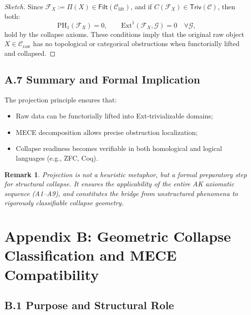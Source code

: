 \documentclass[11pt]{article}
\newtheorem{remark}[theorem]{Remark}
\begin{document}
\begin{proof}[Sketch]
Since \( \mathcal{F}_X := \Pi(X) \in \mathsf{Filt}(\mathcal{C}_{\mathrm{lift}}) \),  
and if \( C(\mathcal{F}_X) \in \mathsf{Triv}(\mathcal{C}) \), then both:
\[
\mathrm{PH}_1(\mathcal{F}_X) = 0, \qquad \mathrm{Ext}^1(\mathcal{F}_X, \mathcal{G}) = 0 \quad \forall \mathcal{G},
\]
hold by the collapse axioms. These conditions imply that the original raw object \( X \in \mathcal{C}_{\mathrm{raw}} \)  
has no topological or categorical obstructions when functorially lifted and collapsed.
\end{proof}

\subsection*{A.7 Summary and Formal Implication}

The projection principle ensures that:

\begin{itemize}
  \item Raw data can be functorially lifted into Ext-trivializable domains;
  \item MECE decomposition allows precise obstruction localization;
  \item Collapse readiness becomes verifiable in both homological and logical languages (e.g., ZFC, Coq).
\end{itemize}

\begin{remark}
Projection is not a heuristic metaphor, but a formal preparatory step for structural collapse.  
It ensures the applicability of the entire AK axiomatic sequence (A1--A9), and constitutes the bridge  
from unstructured phenomena to rigorously classifiable collapse geometry.
\end{remark}



\section*{Appendix B: Geometric Collapse Classification and MECE Compatibility}

\subsection*{B.1 Purpose and Structural Role}
\end{document}
